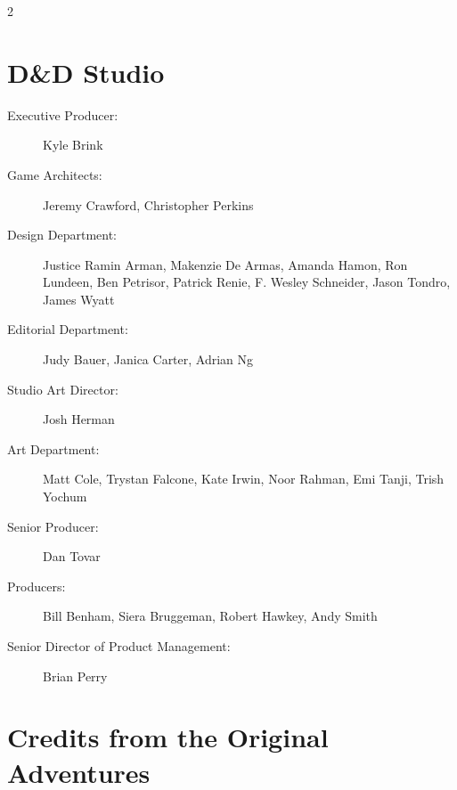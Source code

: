 \documentclass[10pt,a4paper,twoside,bg=print,twocolumn,openany,nodeprecatedcode]{dndbook}
\begin{document}
\begin{description}
\begin{multicols}{2}
\section{D\&D Studio}

\begin{description}
\item[Executive Producer:]
Kyle Brink
\item[Game Architects:]
Jeremy Crawford, Christopher Perkins
\item[Design Department:]
Justice Ramin Arman, Makenzie De Armas, Amanda Hamon, Ron Lundeen, Ben Petrisor, Patrick Renie, F. Wesley Schneider, Jason Tondro, James Wyatt
\item[Editorial Department:]
Judy Bauer, Janica Carter, Adrian Ng
\item[Studio Art Director:]
Josh Herman
\item[Art Department:]
Matt Cole, Trystan Falcone, Kate Irwin, Noor Rahman, Emi Tanji, Trish Yochum
\item[Senior Producer:]
Dan Tovar
\item[Producers:]
Bill Benham, Siera Bruggeman, Robert Hawkey, Andy Smith
\item[Senior Director of Product Management:]
Brian Perry
\end{description}

\end{multicols}

\end{description}

\section{Credits from the Original Adventures}
\end{document}
